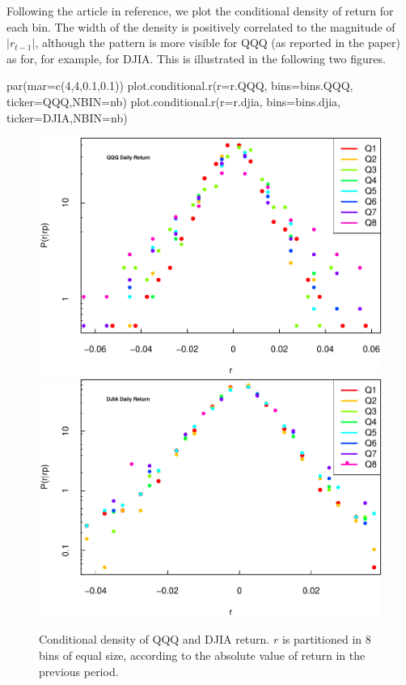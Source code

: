 \documentclass[
  11pt,
]{article}
\newenvironment{Shaded}{\begin{snugshade}}{\end{snugshade}}
\newcommand{\AttributeTok}[1]{\textcolor[rgb]{0.77,0.63,0.00}{#1}}
\newcommand{\DecValTok}[1]{\textcolor[rgb]{0.00,0.00,0.81}{#1}}
\newcommand{\FloatTok}[1]{\textcolor[rgb]{0.00,0.00,0.81}{#1}}
\newcommand{\FunctionTok}[1]{\textcolor[rgb]{0.00,0.00,0.00}{#1}}
\newcommand{\NormalTok}[1]{#1}
\newcommand{\StringTok}[1]{\textcolor[rgb]{0.31,0.60,0.02}{#1}}
\begin{document}
Following the article in reference, we plot the conditional density of return for each bin. The width of the density is positively correlated to the magnitude of \(|r_{t-1}|\),
although the pattern is more visible for QQQ (as reported in the paper) as for, for example, for DJIA. This is illustrated in the following two figures.

\begin{Shaded}
\begin{Highlighting}[]
\FunctionTok{par}\NormalTok{(}\AttributeTok{mar=}\FunctionTok{c}\NormalTok{(}\DecValTok{4}\NormalTok{,}\DecValTok{4}\NormalTok{,}\FloatTok{0.1}\NormalTok{,}\FloatTok{0.1}\NormalTok{))}
\FunctionTok{plot.conditional.r}\NormalTok{(}\AttributeTok{r=}\NormalTok{r.QQQ, }\AttributeTok{bins=}\NormalTok{bins.QQQ, }\AttributeTok{ticker=}\StringTok{\textquotesingle{}QQQ\textquotesingle{}}\NormalTok{,}\AttributeTok{NBIN=}\NormalTok{nb)}
\FunctionTok{plot.conditional.r}\NormalTok{(}\AttributeTok{r=}\NormalTok{r.djia, }\AttributeTok{bins=}\NormalTok{bins.djia, }\AttributeTok{ticker=}\StringTok{\textquotesingle{}DJIA\textquotesingle{}}\NormalTok{,}\AttributeTok{NBIN=}\NormalTok{nb)}
\end{Highlighting}
\end{Shaded}

\begin{figure}[H]
\includegraphics[width=0.5\linewidth]{figs/condist-plot-1} \includegraphics[width=0.5\linewidth]{figs/condist-plot-2} \caption{Conditional density of QQQ and DJIA return. $r$ is partitioned in 8 bins of equal size, according to the absolute value of return in the previous period.}\label{fig:condist-plot}
\end{figure}
\end{document}
